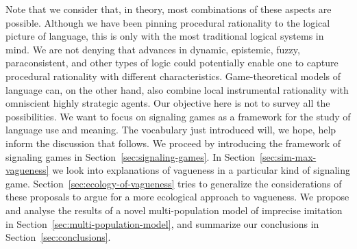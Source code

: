 \documentclass[a4paper]{article}
\begin{document}
Note that we consider that, in theory, most combinations of these aspects are possible.
Although we have been pinning procedural rationality to the logical picture of language, this is only with the most traditional logical systems in mind.
We are not denying that advances in dynamic, epistemic, fuzzy, paraconsistent, and other types of logic could potentially enable one to capture procedural rationality with different characteristics.
Game-theoretical models of language can, on the other hand, also combine local instrumental rationality with omniscient highly strategic agents.
Our objective here is not to survey all the possibilities.
We want to focus on signaling games as a framework for the study of language use and meaning.
The vocabulary just introduced will, we hope, help inform the discussion that follows.
We proceed by introducing the framework of signaling games in Section~\ref{sec:signaling-games}.
In Section~\ref{sec:sim-max-vagueness} we look into explanations of vagueness in a particular kind of signaling game.
Section~\ref{sec:ecology-of-vagueness} tries to generalize the considerations of these proposals to argue for a more ecological approach to vagueness.
We propose and analyse the results of a novel multi-population model of imprecise imitation in Section~\ref{sec:multi-population-model}, and summarize our conclusions in Section~\ref{sec:conclusions}.


%
\end{document}
